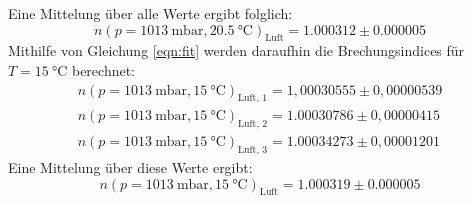 Eine Mittelung über alle Werte ergibt folglich:
\begin{equation}
    n(p = \SI{1013}{\milli \bar}, \SI{20,5}{\celsius} )_\text{Luft} = 1.000312 \pm 0.000005
\end{equation}
Mithilfe von Gleichung \eqref{eqn:fit} werden daraufhin die Brechungsindices für $T = \SI{15}{\celsius}$
berechnet:
\begin{align}                                 
    n(p = \SI{1013}{\milli \bar}, \SI{15}{\celsius} )_\text{Luft, 1} = 1,00030555 \pm 0,00000539 \\
    n(p = \SI{1013}{\milli \bar}, \SI{15}{\celsius} )_\text{Luft, 2} = 1.00030786 \pm 0,00000415 \\
    n(p = \SI{1013}{\milli \bar}, \SI{15}{\celsius} )_\text{Luft, 3} = 1.00034273 \pm 0,00001201
\end{align}
Eine Mittelung über diese Werte ergibt:
\begin{equation}
    n(p = \SI{1013}{\milli \bar}, \SI{15}{\celsius} )_\text{Luft} = 1.000319 \pm 0.000005
\end{equation}